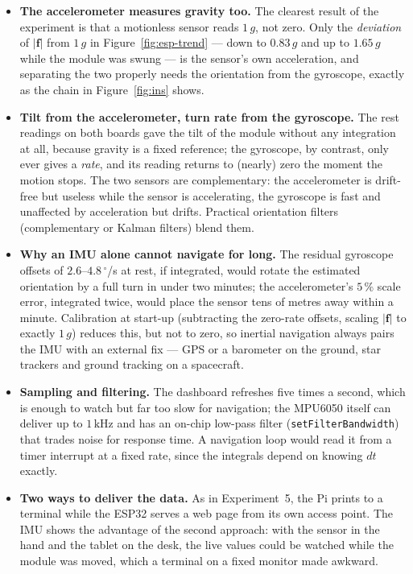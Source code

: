 \documentclass[10pt,a4paper]{article}
\begin{document}
\begin{itemize}
  \item \textbf{The accelerometer measures gravity too.} The clearest result of the
        experiment is that a motionless sensor reads $1\,g$, not zero. Only the
        \emph{deviation} of $|\mathbf f|$ from $1\,g$ in Figure~\ref{fig:esp-trend}
        --- down to $0.83\,g$ and up to $1.65\,g$ while the module was swung --- is the
        sensor's own acceleration, and separating the two properly needs the
        orientation from the gyroscope, exactly as the chain in Figure~\ref{fig:ins}
        shows.
  \item \textbf{Tilt from the accelerometer, turn rate from the gyroscope.} The
        rest readings on both boards gave the tilt of the module without any
        integration at all, because gravity is a fixed reference; the gyroscope, by
        contrast, only ever gives a \emph{rate}, and its reading returns to (nearly)
        zero the moment the motion stops. The two sensors are complementary: the
        accelerometer is drift-free but useless while the sensor is accelerating, the
        gyroscope is fast and unaffected by acceleration but drifts. Practical
        orientation filters (complementary or Kalman filters) blend them.
  \item \textbf{Why an IMU alone cannot navigate for long.} The residual gyroscope
        offsets of $2.6$--$4.8\,^{\circ}$/s at rest, if integrated, would rotate the
        estimated orientation by a full turn in under two minutes; the accelerometer's
        $5\,\%$ scale error, integrated twice, would place the sensor tens of metres away
        within a minute. Calibration at start-up (subtracting the zero-rate offsets,
        scaling $|\mathbf f|$ to exactly $1\,g$) reduces this, but not to zero, so
        inertial navigation always pairs the IMU with an external fix --- GPS or a
        barometer on the ground, star trackers and ground tracking on a spacecraft.
  \item \textbf{Sampling and filtering.} The dashboard refreshes five times a second,
        which is enough to watch but far too slow for navigation; the MPU6050 itself can
        deliver up to $1\,\mathrm{kHz}$ and has an on-chip low-pass filter
        (\texttt{setFilterBandwidth}) that trades noise for response time. A navigation
        loop would read it from a timer interrupt at a fixed rate, since the integrals
        depend on knowing $dt$ exactly.
  \item \textbf{Two ways to deliver the data.} As in Experiment~5, the Pi prints to a
        terminal while the ESP32 serves a web page from its own access point. The IMU
        shows the advantage of the second approach: with the sensor in the hand and the
        tablet on the desk, the live values could be watched while the module was
        moved, which a terminal on a fixed monitor made awkward.
\end{itemize}
\end{document}

